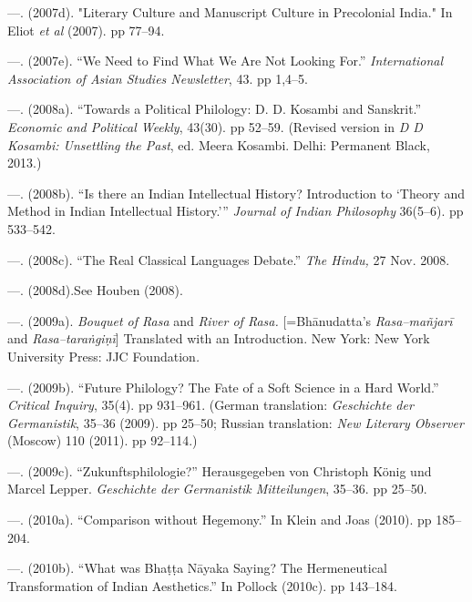 \begin{thebibliography}{99}
 \item —. (2007d). "Literary Culture and Manuscript Culture in Precolonial India." In Eliot \textit{et al} (2007). pp 77–94.

 \item —. (2007e). “We Need to Find What We Are Not Looking For.” \textit{International Association of Asian Studies Newsletter}, 43. pp 1,4–5.

 \item —. (2008a). “Towards a Political Philology: D. D. Kosambi and Sanskrit.” \textit{Economic and Political Weekly}, 43(30). pp 52–59. (Revised version in \textit{D D Kosambi: Unsettling the Past}, ed. Meera Kosambi. Delhi: Permanent Black, 2013.)

 \item —. (2008b). “Is there an Indian Intellectual History? Introduction to ‘Theory and Method in Indian Intellectual History.’” \textit{Journal of Indian Philosophy} 36(5–6). pp 533–542.

 \item —. (2008c). “The Real Classical Languages Debate.” \textit{The Hindu,} 27 Nov. 2008.

 \item —. (2008d).See Houben (2008).

 \item —. (2009a).\textit{ Bouquet of Rasa }and\textit{ River of Rasa. }[=Bhānudatta’s \textit{Rasa–mañjarī} and \textit{Rasa–taraṅgiṇī}] Translated with an Introduction. New York: New York University Press: JJC Foundation\textit{.}

 \item —. (2009b). “Future Philology? The Fate of a Soft Science in a Hard World.” \textit{Critical Inquiry}, 35(4). pp 931–961. (German translation: \textit{Geschichte der Germanistik}, 35–36 (2009). pp 25–50; Russian translation: \textit{New Literary Observer }(Moscow) 110 (2011). pp 92–114.) 

 \item —. (2009c). “Zukunftsphilologie?” Herausgegeben von Christoph König und Marcel Lepper. \textit{Geschichte der Germanistik Mitteilungen}, 35–36. pp 25–50.

 \item —. (2010a). “Comparison without Hegemony.” In Klein and Joas (2010). pp 185–204.

 \item —. (2010b). “What was Bhaṭṭa Nāyaka Saying? The Hermeneutical Transformation of Indian Aesthetics.” In Pollock (2010c). pp 143–184.


\end{thebibliography}
